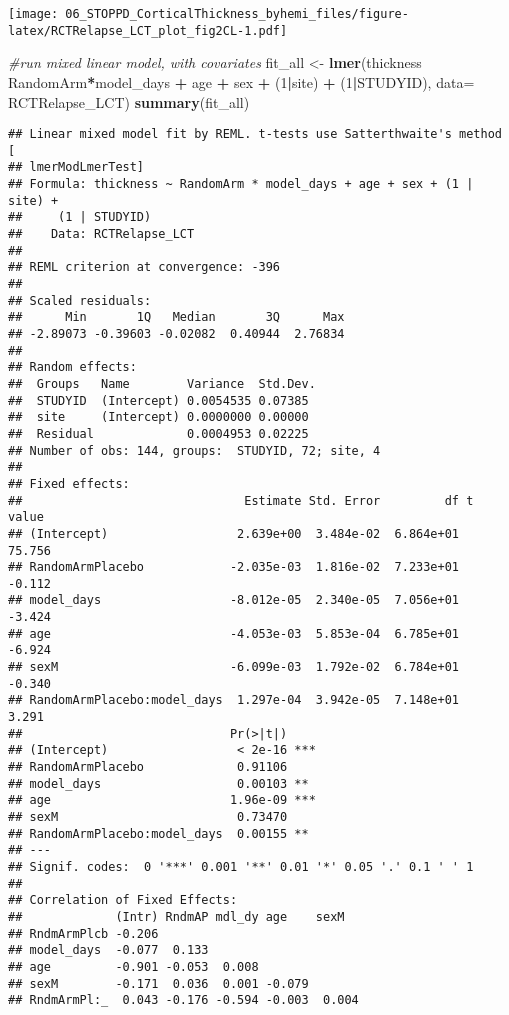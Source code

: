 \documentclass[]{article}
\newenvironment{Shaded}{\begin{snugshade}}{\end{snugshade}}
\newcommand{\KeywordTok}[1]{\textcolor[rgb]{0.13,0.29,0.53}{\textbf{#1}}}
\newcommand{\DataTypeTok}[1]{\textcolor[rgb]{0.13,0.29,0.53}{#1}}
\newcommand{\DecValTok}[1]{\textcolor[rgb]{0.00,0.00,0.81}{#1}}
\newcommand{\StringTok}[1]{\textcolor[rgb]{0.31,0.60,0.02}{#1}}
\newcommand{\CommentTok}[1]{\textcolor[rgb]{0.56,0.35,0.01}{\textit{#1}}}
\newcommand{\OperatorTok}[1]{\textcolor[rgb]{0.81,0.36,0.00}{\textbf{#1}}}
\newcommand{\NormalTok}[1]{#1}
\theoremstyle{definition}
\theoremstyle{definition}
\theoremstyle{definition}
\theoremstyle{remark}
\begin{document}
\texttt{[image: 06\_STOPPD\_CorticalThickness\_byhemi\_files/figure-latex/RCTRelapse\_LCT\_plot\_fig2CL-1.pdf]}

\begin{Shaded}
\begin{Highlighting}[]
\CommentTok{#run mixed linear model, with covariates}
\NormalTok{  fit_all <-}\StringTok{ }\KeywordTok{lmer}\NormalTok{(thickness }\OperatorTok{~}\StringTok{ }\NormalTok{RandomArm}\OperatorTok{*}\NormalTok{model_days }\OperatorTok{+}\StringTok{ }\NormalTok{age }\OperatorTok{+}\StringTok{ }\NormalTok{sex }\OperatorTok{+}\StringTok{ }\NormalTok{(}\DecValTok{1}\OperatorTok{|}\NormalTok{site) }\OperatorTok{+}\StringTok{ }\NormalTok{(}\DecValTok{1}\OperatorTok{|}\NormalTok{STUDYID), }\DataTypeTok{data=}\NormalTok{ RCTRelapse_LCT)}
  \KeywordTok{summary}\NormalTok{(fit_all)}
\end{Highlighting}
\end{Shaded}

\begin{verbatim}
## Linear mixed model fit by REML. t-tests use Satterthwaite's method [
## lmerModLmerTest]
## Formula: thickness ~ RandomArm * model_days + age + sex + (1 | site) +  
##     (1 | STUDYID)
##    Data: RCTRelapse_LCT
## 
## REML criterion at convergence: -396
## 
## Scaled residuals: 
##      Min       1Q   Median       3Q      Max 
## -2.89073 -0.39603 -0.02082  0.40944  2.76834 
## 
## Random effects:
##  Groups   Name        Variance  Std.Dev.
##  STUDYID  (Intercept) 0.0054535 0.07385 
##  site     (Intercept) 0.0000000 0.00000 
##  Residual             0.0004953 0.02225 
## Number of obs: 144, groups:  STUDYID, 72; site, 4
## 
## Fixed effects:
##                               Estimate Std. Error         df t value
## (Intercept)                  2.639e+00  3.484e-02  6.864e+01  75.756
## RandomArmPlacebo            -2.035e-03  1.816e-02  7.233e+01  -0.112
## model_days                  -8.012e-05  2.340e-05  7.056e+01  -3.424
## age                         -4.053e-03  5.853e-04  6.785e+01  -6.924
## sexM                        -6.099e-03  1.792e-02  6.784e+01  -0.340
## RandomArmPlacebo:model_days  1.297e-04  3.942e-05  7.148e+01   3.291
##                             Pr(>|t|)    
## (Intercept)                  < 2e-16 ***
## RandomArmPlacebo             0.91106    
## model_days                   0.00103 ** 
## age                         1.96e-09 ***
## sexM                         0.73470    
## RandomArmPlacebo:model_days  0.00155 ** 
## ---
## Signif. codes:  0 '***' 0.001 '**' 0.01 '*' 0.05 '.' 0.1 ' ' 1
## 
## Correlation of Fixed Effects:
##             (Intr) RndmAP mdl_dy age    sexM  
## RndmArmPlcb -0.206                            
## model_days  -0.077  0.133                     
## age         -0.901 -0.053  0.008              
## sexM        -0.171  0.036  0.001 -0.079       
## RndmArmPl:_  0.043 -0.176 -0.594 -0.003  0.004
\end{verbatim}
\end{document}
